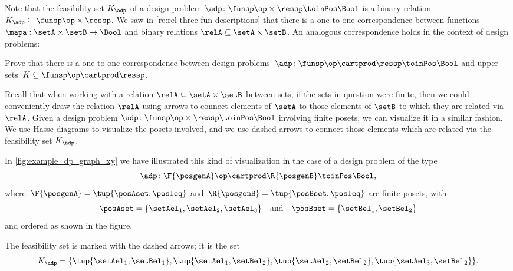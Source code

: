 Note that the feasibility set $K_\adp$ of a design problem $\adp \colon \funsp \op \times \ressp\toinPos \Bool$ is a binary relation $K_\adp \subseteq \funsp\op \times \ressp$.
We saw in \cref{re:rel-three-fun-descriptions} that there is a one-to-one correspondence between functions $\mapa : \setA \times \setB \to \Bool$ and binary relations $\relA \subseteq \setA \times \setB$.
An analogous correspondence holds in the context of design problems:

\begin{exercise}
    \label{ex:adp-uppersets}
    Prove that there is a one-to-one correspondence between design problems~$\adp \colon \funsp \op \cartprod \ressp\toinPos \Bool$ and upper sets~$K \subseteq \funsp\op \cartprod \ressp$.
\end{exercise}
\begin{solution}
\end{solution}

Recall that when working with a relation $\relA \subseteq \setA \times \setB$ between sets, if the sets in question were finite, then we could conveniently draw the relation $\relA$ using arrows to connect elements of $\setA$ to those elements of $\setB$ to which they are related via $\relA$.
Given a design problem $\adp \colon \funsp \op \times \ressp\toinPos \Bool$ involving finite posets, we can visualize it in a similar fashion.
We use Hasse diagrams to visualize the posets involved, and we use dashed arrows to connect those elements which are related via the feasibility set $K_\adp$.

\begin{marginfigure}
    \centering
    \caption{}
    \label{fig:example_dp_graph_xy}
\end{marginfigure}

\begin{example}
    \label{exa:visualize-dp}
    In \cref{fig:example_dp_graph_xy} we have illustrated this kind of visualization in the case of a design problem of the type
    \begin{equation*}
        \adp \colon \F{\posgenA} \op \cartprod  \R{\posgenB} \toinPos \Bool,
    \end{equation*}
    where~$\F{\posgenA} = \tup{\posAset, \posleq}$ and~$ \R{\posgenB} = \tup{\posBset, \posleq}$ are finite posets, with
    \begin{equation}
        \posAset = \{ \setAel_1, \setAel_2, \setAel_3 \}
        \quad \text{and} \quad
        \posBset =  \{ \setBel_1, \setBel_2\}
    \end{equation}
    and ordered as shown in the figure.
    
    The feasibility set is marked with the dashed arrows; it is the set
    \begin{equation*}
        K_\adp = \{\tup{\setAel_1, \setBel_1}, \tup{\setAel_1, \setBel_2}, \tup{\setAel_2, \setBel_2}, \tup{\setAel_3, \setBel_2} \}.
    \end{equation*}
\end{example}


